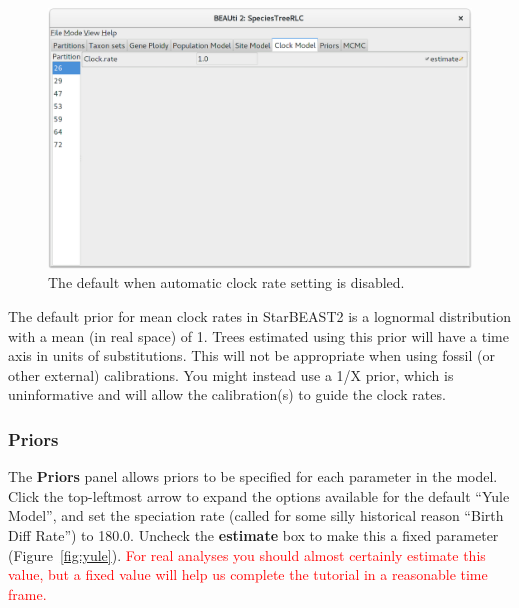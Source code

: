 \documentclass{article}
\begin{document}
\begin{figure}[htb!]
\centering
\includegraphics[width=\textwidth]{figures/beauti-clock.png}
\caption{The default when automatic clock rate setting is disabled.}
\label{fig:clock}
\end{figure}

The default prior for mean clock rates in StarBEAST2 is a lognormal distribution
with a mean (in real space) of 1. Trees estimated using this prior will have a
time axis in units of substitutions. This will not be appropriate when using
fossil (or other external) calibrations. You might instead use a 1/X prior,
which is uninformative and will allow the calibration(s) to guide the clock
rates.

\clearpage

\subsubsection*{Priors}

The \textbf{Priors} panel allows priors to be specified for each parameter in
the model. Click the top-leftmost arrow to expand the options available for the
default ``Yule Model'', and set the speciation rate (called for some silly
historical reason ``Birth Diff Rate'') to 180.0. Uncheck the
\textbf{estimate} box to make this a fixed parameter (Figure~\ref{fig:yule}). \textcolor{red}{For real
analyses you should almost certainly estimate this value, but a fixed value will
help us complete the tutorial in a reasonable time frame.}
\end{document}
